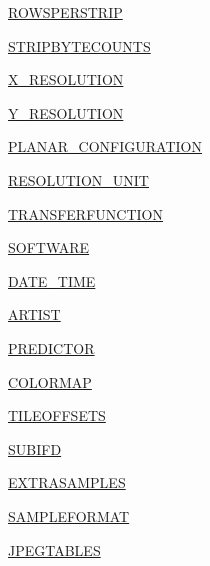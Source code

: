 \begin{DoxyCompactItemize}
\item 
\hyperlink{namespacePIL_1_1TiffImagePlugin_a7c0dc203e2913b83759cf0284db98374}{R\+O\+W\+S\+P\+E\+R\+S\+T\+R\+IP}
\item 
\hyperlink{namespacePIL_1_1TiffImagePlugin_a635ef3184a506df35fba8c2f3da7d66f}{S\+T\+R\+I\+P\+B\+Y\+T\+E\+C\+O\+U\+N\+TS}
\item 
\hyperlink{namespacePIL_1_1TiffImagePlugin_a88028494614e8150c9b8d13aa3fcfa08}{X\+\_\+\+R\+E\+S\+O\+L\+U\+T\+I\+ON}
\item 
\hyperlink{namespacePIL_1_1TiffImagePlugin_aeade07a5abef3ed897cea724503b6859}{Y\+\_\+\+R\+E\+S\+O\+L\+U\+T\+I\+ON}
\item 
\hyperlink{namespacePIL_1_1TiffImagePlugin_aeb71710666e976c799fd9b06f5f8399c}{P\+L\+A\+N\+A\+R\+\_\+\+C\+O\+N\+F\+I\+G\+U\+R\+A\+T\+I\+ON}
\item 
\hyperlink{namespacePIL_1_1TiffImagePlugin_a6a94227fa97f8fa44becc4b6e1aa0993}{R\+E\+S\+O\+L\+U\+T\+I\+O\+N\+\_\+\+U\+N\+IT}
\item 
\hyperlink{namespacePIL_1_1TiffImagePlugin_a2155ff0f791603ea5060135c9a33c1cc}{T\+R\+A\+N\+S\+F\+E\+R\+F\+U\+N\+C\+T\+I\+ON}
\item 
\hyperlink{namespacePIL_1_1TiffImagePlugin_ac610c0e06a9819c69b09caa3933489cf}{S\+O\+F\+T\+W\+A\+RE}
\item 
\hyperlink{namespacePIL_1_1TiffImagePlugin_a0c8d64457b63dc5aa3a220d687ef6fce}{D\+A\+T\+E\+\_\+\+T\+I\+ME}
\item 
\hyperlink{namespacePIL_1_1TiffImagePlugin_a49078e10a00839681433f94d25f9c35b}{A\+R\+T\+I\+ST}
\item 
\hyperlink{namespacePIL_1_1TiffImagePlugin_a06248be8ac088bab34491c024165e81e}{P\+R\+E\+D\+I\+C\+T\+OR}
\item 
\hyperlink{namespacePIL_1_1TiffImagePlugin_a59b060cc7735a5a04262215800c6eba1}{C\+O\+L\+O\+R\+M\+AP}
\item 
\hyperlink{namespacePIL_1_1TiffImagePlugin_a5aaf612e8505fe5eec049a81e2a46e32}{T\+I\+L\+E\+O\+F\+F\+S\+E\+TS}
\item 
\hyperlink{namespacePIL_1_1TiffImagePlugin_ac963a95f464bedf72d8f10c49784c089}{S\+U\+B\+I\+FD}
\item 
\hyperlink{namespacePIL_1_1TiffImagePlugin_aa0c8e3e228e4f03a10507ec14aa169a5}{E\+X\+T\+R\+A\+S\+A\+M\+P\+L\+ES}
\item 
\hyperlink{namespacePIL_1_1TiffImagePlugin_ae828e5f21efc670cd9b62e769c87ad72}{S\+A\+M\+P\+L\+E\+F\+O\+R\+M\+AT}
\item 
\hyperlink{namespacePIL_1_1TiffImagePlugin_a49a3cd0275103c6ee0e740331aba791f}{J\+P\+E\+G\+T\+A\+B\+L\+ES}

\end{DoxyCompactItemize}
